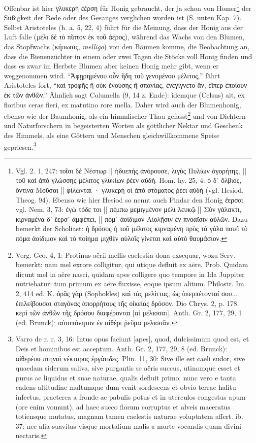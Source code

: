 \documentclass[a4paper, 11pt, oneside]{article}
\begin{document}
Offenbar ist hier γλυκερὴ ἐέρση für Honig gebraucht, der ja schon von Homer\footnote{Vgl. 2. 1, 247: τοῖσι δὲ Νέστωρ || ἡδυεπὴς ἀνόρουσε, λιγὺς Πυλίων ἀγορήτης, || τοῦ καὶ ἀπὸ γλώσσης μέλιτος γλυκίων ῥέεν αὐδή. Hom. hy. 25, 4: ὁ δ᾽ ὄλβιος, ὄντινα Μοῦσαι || φίλωνται · γλυκερή οἱ ἀπὸ στόματος ῥέει αὐδή (vgl. Hesiod. Theog. 94). Ebenso wie hier Hesiod so nennt auch Pindar den Honig ἔερσα: vgl. Nem. 3, 73: ἐγὼ τόδε τοι || πέμπω μεμιγμένον μέλι λευκῷ || Σὺν γάλακτι, κιρναμένα δ᾽ ἔερσ᾽ ἀμφέπει, || πόμ᾽ ἀοίδιμον Αἰολῇσιν ἐν πνοαῖσιν αὐλῶν. Dazu bemerkt der Scholiast: ἡ δρόσος ἡ τοῦ μέλιτος κιρναμένη πρὸς τὸ γάλα ποιεῖ τὸ πόμα ἀοίδιμον καὶ τὸ ποίημα μιχθὲν αὐλοῖς γίνεται καὶ αὐτὸ θαυμάσιον.} der Süßigkeit der Rede oder des Gesanges verglichen worden ist (S. unten Kap. 7). Selbst Aristoteles (h. a. 5, 22, 4) führt für die Meinung, dass der Honig aus der Luft falle (μέλι δὲ τὸ πῖπτον ἐκ τοῦ ἀέρος), während das Wachs von den Blumen, das Stopfwachs (κήπωσις, \emph{melligo}) von den Bäumen komme, die Beobachtung an, dass die Bienenzüchter in einem oder zwei Tagen die Stöcke voll Honig finden und dass es zwar im Herbste Blumen aber keinen Honig mehr gibt, wenn er weggenommen wird. "`Ἀφῃρημένου οὖν ἤδη τοῦ γενομένου μέλιτος,"' fährt Aristoteles fort, "`καὶ τροφῆς ἢ οὐκ ἐνούσης ἢ σπανίας, ἐνεγίγνετο ἄν, εἴπερ ἐποίουν ἐκ τῶν ἀνθῶν."' Ähnlich sagt Columella (9, 14 z. Ende): idemque (Celsus) ait, ex fioribus ceras fieri, ex matutino rore mella. Daher wird auch der Blumenhonig, ebenso wie der Baumhonig, als ein himmlischer Thau gefasst\footnote{Verg. Geo. 4, 1: Protinus aërii mellis caelestia dona exsequar, wozu Serv. bemerkt: nam mel exrore colligitur, qui utique defluit ex aëre. Prob. Quidam dicunt mel in aëre nasci, quidam apes colligere quo tempore in Ida Juppiter nutriebatur: tum primum ex aëre fluxisse, eoque ipsum alitum. Philostr. Im. 2, 414 ed. K. ὁρᾶς γὰρ (Sophokles) καὶ τὰς μελίττας, ὡς ὑπερπέτονταί σου... ἐπιλείβουσαι σταγόνας ἀπορρήτους τῆς οἰκείας δρόσον. Dio Chrys. 2, p. 178. κερὶ τῶν ἀνθῶν τῆς δρόσου διαφέρονται [αἱ μέλισσαι]. Anth. Gr. 2, 177, 29, 1 (ed. Brunck); αὐτοπόνητον ἐν αἰθέρι ῥεῦμα μελισσᾶν.} und von Dichtern und Naturforschern in begeisterten Worten als göttlicher Nektar und Geschenk des Himmels, als eine Göttern und Menschen gleichwillkommene Speise gepriesen.\footnote{Varro de r. r. 3, 16: Intus opus faciunt [apes], quod, dulcissimum quod est, et Deis et hominibus est acceptum. Anth. Gr. 2, 177, 29, 8 (ed. Brunck): αἰθερέου πτηναὶ νέκταρος ἐργάτιδες. Plin. 11, 30: Sive ille est caeli sudor, sive quaedam siderum saliva, sive purgantis se aëris succus, utinamque esset et purus ac liquidus et suae naturae, qualis defluit primo; nunc vero e tanta cadens altitudine multumque dum venit sordescens et obvio terrae halitu infectus, praeterea a fronde ac pabulis potus et in uterculos congestus apum (ore enim vomunt), ad haec succo florum corruptus et alveis maceratus totiensque mutatus, magnam tamen caelestis naturae voluptatem affert. ib. 37: nec alia suavitas visque mortalium malis a morte vocandis quam divini nectaris.}
\end{document}
